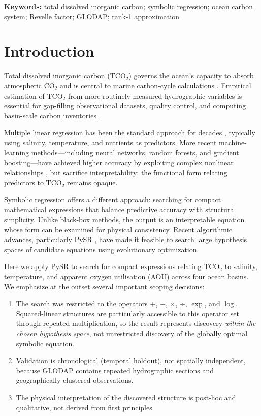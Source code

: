\documentclass[12pt,a4paper]{article}
\begin{document}
\medskip
\noindent\textbf{Keywords:} total dissolved inorganic carbon; symbolic regression; ocean carbon system; Revelle factor; GLODAP; rank-1 approximation

\section{Introduction}
\label{sec:intro}

Total dissolved inorganic carbon (TCO$_2$) governs the ocean's capacity to absorb atmospheric CO$_2$ and is central to marine carbon-cycle calculations \citep{Sarmiento2006}. Empirical estimation of TCO$_2$ from more routinely measured hydrographic variables is essential for gap-filling observational datasets, quality control, and computing basin-scale carbon inventories \citep{Takahashi1993, Key2004}.

Multiple linear regression has been the standard approach for decades \citep{Goyet1991, Millero1998}, typically using salinity, temperature, and nutrients as predictors. More recent machine-learning methods---including neural networks, random forests, and gradient boosting---have achieved higher accuracy by exploiting complex nonlinear relationships \citep{Broullon2019, Carter2018}, but sacrifice interpretability: the functional form relating predictors to TCO$_2$ remains opaque.

Symbolic regression offers a different approach: searching for compact mathematical expressions that balance predictive accuracy with structural simplicity. Unlike black-box methods, the output is an interpretable equation whose form can be examined for physical consistency. Recent algorithmic advances, particularly PySR \citep{Cranmer2023}, have made it feasible to search large hypothesis spaces of candidate equations using evolutionary optimization.

Here we apply PySR to search for compact expressions relating TCO$_2$ to salinity, temperature, and apparent oxygen utilisation (AOU) across four ocean basins. We emphasize at the outset several important scoping decisions:

\begin{enumerate}[nosep]
    \item The search was restricted to the operators $+$, $-$, $\times$, $\div$, $\exp$, and $\log$. Squared-linear structures are particularly accessible to this operator set through repeated multiplication, so the result represents discovery \emph{within the chosen hypothesis space}, not unrestricted discovery of the globally optimal symbolic equation.
    \item Validation is chronological (temporal holdout), not spatially independent, because GLODAP contains repeated hydrographic sections and geographically clustered observations.
    \item The physical interpretation of the discovered structure is post-hoc and qualitative, not derived from first principles.
\end{enumerate}
\end{document}
